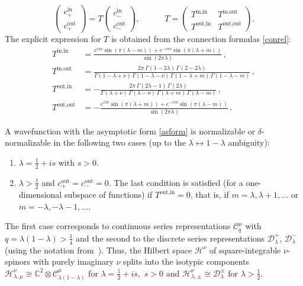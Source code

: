 \documentclass[11pt]{article}
\newcommand{\calC}{\mathcal{C}}
\newcommand{\calD}{\mathcal{D}}
\newcommand{\calH}{\mathcal{H}}
\newcommand{\CC}{\mathbb{C}}
\newcommand{\IN}{\text{in}}
\newcommand{\OUT}{\text{out}}
\begin{document}
\begin{equation}
\begin{pmatrix} c_{+}^{\IN}\\ c_{+}^{\OUT} \end{pmatrix}
=T\begin{pmatrix} c_{-}^{\IN}\\ c_{-}^{\OUT} \end{pmatrix},\qquad\quad
T=\begin{pmatrix}
T^{\IN,\IN} & T^{\IN,\OUT}\\ T^{\OUT,\IN} & T^{\OUT,\OUT}
\end{pmatrix}.
\end{equation}
The explicit expression for $T$ is obtained from the connection formulas \eqref{conrel}:
\begin{equation}
\begin{aligned}
T^{\IN,\IN} &=
\frac{e^{i\pi\nu}\sin(\pi(\lambda-m))+e^{-i\pi\nu}\sin(\pi(\lambda+m))}
{\sin(2\pi\lambda)}\,,\\[4pt]
T^{\IN,\OUT} &=
\frac{2\pi\,\Gamma(1-2\lambda)\,\Gamma(2-2\lambda)}
{\Gamma(1-\lambda+\nu)\,\Gamma(1-\lambda-\nu)\,
\Gamma(1-\lambda+m)\,\Gamma(1-\lambda-m)}\,,\\[4pt]
T^{\OUT,\IN} &=
-\frac{2\pi\,\Gamma(2\lambda-1)\,\Gamma(2\lambda)}
{\Gamma(\lambda+\nu)\,\Gamma(\lambda-\nu)\,
\Gamma(\lambda+m)\,\Gamma(\lambda-m)}\,,\\[4pt]
T^{\OUT,\OUT} &=
-\frac{e^{i\pi\nu}\sin(\pi(\lambda+m))+e^{-i\pi\nu}\sin(\pi(\lambda-m))}
{\sin(2\pi\lambda)}\,.
\end{aligned}
\end{equation}

A wavefunction with the asymptotic form \eqref{asform} is normalizable or $\delta$-normalizable in the following two cases (up to the $\lambda\leftrightarrow 1-\lambda$ ambiguity):
\begin{enumerate}
\item $\lambda=\frac{1}{2}+is$ with $s>0$.
\item $\lambda>\frac{1}{2}$ and $c_{+}^{\OUT}=c_{-}^{\OUT}=0$. The last condition is satisfied (for a one-dimensional subspace of functions) if $T^{\OUT,\IN}=0$, that is, if $m=\lambda,\lambda+1,\ldots$ or $m=-\lambda,-\lambda-1,\ldots$.
\end{enumerate}
The first case corresponds to continuous series representations $\calC_{q}^{\mu}$ with $q=\lambda(1-\lambda)>\frac{1}{4}$ and the second to the discrete series representations $\calD_{\lambda}^{+}$, $\calD_{\lambda}^{-}$ (using the notation from~\cite{SL2R}). Thus, the Hilbert space $\calH^\nu$ of square-integrable $\nu$-spinors with purely imaginary $\nu$ splits into the isotypic components $\calH^{\nu}_{\lambda,\mu}\cong \CC^{2}\otimes\calC_{\lambda(1-\lambda)}^{\mu}$ for $\lambda=\frac{1}{2}+is$,\, $s>0$ and $\calH^{\nu}_{\lambda,\pm}\cong \calD_{\lambda}^{\pm}$ for $\lambda>\frac{1}{2}$.
\end{document}
